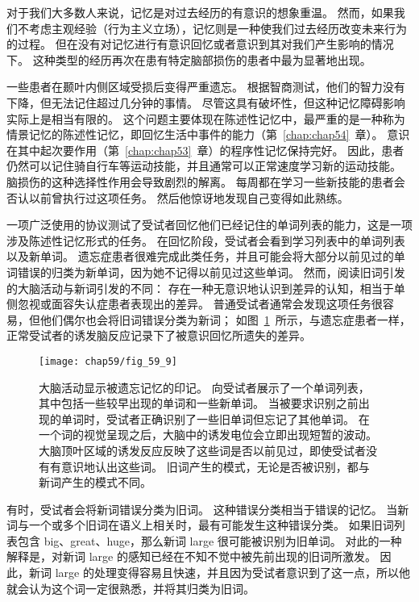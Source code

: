 对于我们大多数人来说，记忆是对过去经历的有意识的想象重温。
然而，如果我们不考虑主观经验（行为主义立场），记忆则是一种使我们过去经历改变未来行为的过程。
但在没有对记忆进行有意识回忆或者意识到其对我们产生影响的情况下。
这种类型的经历再次在患有特定脑部损伤的患者中最为显著地出现。

一些患者在颞叶内侧区域受损后变得严重遗忘。
根据智商测试，他们的智力没有下降，但无法记住超过几分钟的事情。
尽管这具有破坏性，但这种记忆障碍影响实际上是相当有限的。
这个问题主要体现在陈述性记忆中，最严重的是一种称为情景记忆的陈述性记忆，即回忆生活中事件的能力（第~\ref{chap:chap54}~章）。
意识在其中起次要作用（第~\ref{chap:chap53}~章）的程序性记忆保持完好。
因此，患者仍然可以记住骑自行车等运动技能，并且通常可以正常速度学习新的运动技能。
脑损伤的这种选择性作用会导致剧烈的解离。
每周都在学习一些新技能的患者会否认以前曾执行过这项任务。
然后他惊讶地发现自己变得如此熟练。


一项广泛使用的协议测试了受试者回忆他们已经记住的单词列表的能力，这是一项涉及陈述性记忆形式的任务。
在回忆阶段，受试者会看到学习列表中的单词列表以及新单词。
遗忘症患者很难完成此类任务，并且可能会将大部分以前见过的单词错误的归类为新单词，因为她不记得以前见过这些单词。
然而，阅读旧词引发的大脑活动与新词引发的不同：
存在一种无意识地认识到差异的认知，相当于单侧忽视或面容失认症患者表现出的差异。
普通受试者通常会发现这项任务很容易，但他们偶尔也会将旧词错误分类为新词；
如图~\ref{fig:59_9}~所示，与遗忘症患者一样，正常受试者的诱发脑反应记录下了被意识回忆所遗失的差异。


\begin{figure}[htbp]
	\centering
	\texttt{[image: chap59/fig\_59\_9]}
	\caption{大脑活动显示被遗忘记忆的印记。
		向受试者展示了一个单词列表，其中包括一些较早出现的单词和一些新单词。
		当被要求识别之前出现的单词时，受试者正确识别了一些旧单词但忘记了其他单词。
		在一个词的视觉呈现之后，大脑中的诱发电位会立即出现短暂的波动。
		大脑顶叶区域的诱发反应反映了这些词是否以前见过，即使受试者没有有意识地认出这些词。
		旧词产生的模式，无论是否被识别，都与新词产生的模式不同\cite{rugg1998dissociation}。}
	\label{fig:59_9}
\end{figure}


有时，受试者会将新词错误分类为旧词。
这种错误分类相当于错误的记忆。
当新词与一个或多个旧词在语义上相关时，最有可能发生这种错误分类。
如果旧词列表包含 big、great、huge，那么新词 large 很可能被识别为旧单词。
对此的一种解释是，对新词 large 的感知已经在不知不觉中被先前出现的旧词所激发。
因此，新词 large 的处理变得容易且快速，并且因为受试者意识到了这一点，所以他就会认为这个词一定很熟悉，并将其归类为旧词。


